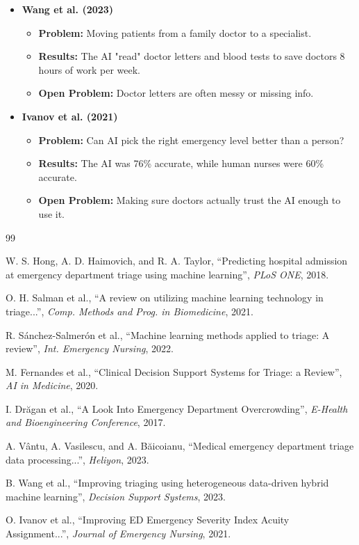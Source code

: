 \documentclass{article}
\begin{document}
\begin{itemize}
    \item \textbf{Wang et al. (2023) \cite{Wang2023}}
    \begin{itemize}
        \item \textbf{Problem:} Moving patients from a family doctor to a specialist.
        \item \textbf{Results:} The AI "read" doctor letters and blood tests to save doctors 8 hours of work per week.
        \item \textbf{Open Problem:} Doctor letters are often messy or missing info.
    \end{itemize}

    \item \textbf{Ivanov et al. (2021) \cite{Ivanov2021}}
    \begin{itemize}
        \item \textbf{Problem:} Can AI pick the right emergency level better than a person?
        \item \textbf{Results:} The AI was 76\% accurate, while human nurses were 60\% accurate.
        \item \textbf{Open Problem:} Making sure doctors actually trust the AI enough to use it.
    \end{itemize}
\end{itemize}

\begin{thebibliography}{99}

W. S. Hong, A. D. Haimovich, and R. A. Taylor, ``Predicting hospital admission at emergency department triage using machine learning'', \emph{PLoS ONE}, 2018.

O. H. Salman et al., ``A review on utilizing machine learning technology in triage...'', \emph{Comp. Methods and Prog. in Biomedicine}, 2021.

R. Sánchez-Salmerón et al., ``Machine learning methods applied to triage: A review'', \emph{Int. Emergency Nursing}, 2022.

M. Fernandes et al., ``Clinical Decision Support Systems for Triage: a Review'', \emph{AI in Medicine}, 2020.

I. Drăgan et al., ``A Look Into Emergency Department Overcrowding'', \emph{E-Health and Bioengineering Conference}, 2017.

A. Vântu, A. Vasilescu, and A. Băicoianu, ``Medical emergency department triage data processing...'', \emph{Heliyon}, 2023.

B. Wang et al., ``Improving triaging using heterogeneous data-driven hybrid machine learning'', \emph{Decision Support Systems}, 2023.

O. Ivanov et al., ``Improving ED Emergency Severity Index Acuity Assignment...'', \emph{Journal of Emergency Nursing}, 2021.

\end{thebibliography}


% 
\end{document}

